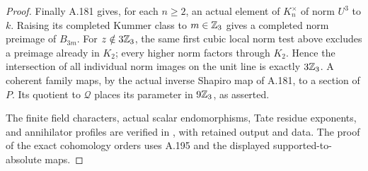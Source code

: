 \begin{proof}
Finally A.181 gives, for each \(n\ge2\), an actual
element of \(K_n^\times\) of norm \(U^3\) to \(k\).
Raising its completed Kummer class to \(m\in\mathbb Z_3\)
gives a completed norm preimage of \(B_{3m}\).
For \(z\notin3\mathbb Z_3\), the same first cubic local
norm test above excludes a preimage already in
\(K_2\); every higher norm factors through \(K_2\).
Hence the intersection of all individual norm
images on the unit line is exactly \(3\mathbb Z_3\).
A coherent family maps, by the actual inverse
Shapiro map of A.181, to a section of \(P\).
Its quotient to \(\mathcal Q\) places its parameter
in \(9\mathbb Z_3\), as asserted.

The finite field characters, actual scalar
endomorphisms, Tate residue exponents, and
annihilator profiles are verified in
,
with retained output and data.  The proof of the
exact cohomology orders uses A.195 and the displayed
supported-to-absolute maps.
\end{proof}
